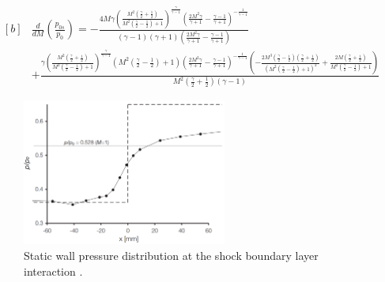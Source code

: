 \documentclass{article}
\begin{document}
\begin{equation}
    \begin{aligned}[b]
    & \frac{d}{dM}\left( \frac{p_{0s}}{p_0} \right) = - \frac{4 M \gamma \left(\frac{M^{2} \left(\frac{\gamma}{2} + \frac{1}{2}\right)}{M^{2} \left(\frac{\gamma}{2} - \frac{1}{2}\right) + 1}\right)^{\frac{\gamma}{\gamma - 1}} \left(\frac{2 M^{2} \gamma}{\gamma + 1} - \frac{\gamma - 1}{\gamma + 1}\right)^{- \frac{1}{\gamma - 1}}}{\left(\gamma - 1\right) \left(\gamma + 1\right) \left(\frac{2 M^{2} \gamma}{\gamma + 1} - \frac{\gamma - 1}{\gamma + 1}\right)} \\
    & + \frac{\gamma \left(\frac{M^{2} \left(\frac{\gamma}{2} + \frac{1}{2}\right)}{M^{2} \left(\frac{\gamma}{2} - \frac{1}{2}\right) + 1}\right)^{\frac{\gamma}{\gamma - 1}} \left(M^{2} \left(\frac{\gamma}{2} - \frac{1}{2}\right) + 1\right) \left(\frac{2 M^{2} \gamma}{\gamma + 1} - \frac{\gamma - 1}{\gamma + 1}\right)^{- \frac{1}{\gamma - 1}} \left(- \frac{2 M^{3} \left(\frac{\gamma}{2} - \frac{1}{2}\right) \left(\frac{\gamma}{2} + \frac{1}{2}\right)}{\left(M^{2} \left(\frac{\gamma}{2} - \frac{1}{2}\right) + 1\right)^{2}} + \frac{2 M \left(\frac{\gamma}{2} + \frac{1}{2}\right)}{M^{2} \left(\frac{\gamma}{2} - \frac{1}{2}\right) + 1}\right)}{M^{2} \left(\frac{\gamma}{2} + \frac{1}{2}\right) \left(\gamma - 1\right)}
    \end{aligned}
    \label{eqn:dp0sr_dm}
\end{equation}


\begin{figure}[H]
    \centering
    \includegraphics[width=0.6\textwidth]{SBLI_pressure_smearing.png}
    \caption{Static wall pressure distribution at the shock boundary layer interaction \cite{babinsky_delery:2011}.}
    \label{fig:SBLI_pressure_smearing}
\end{figure}
\end{document}
